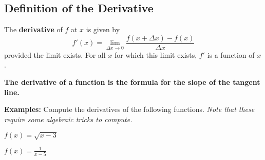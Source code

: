 \subsection*{Definition of the Derivative}
\begin{tcolorbox}[title= DEFINITION OF THE DERIVATIVE OF A FUNCTION,colframe=black,sharp corners,colback=white,colbacktitle=white,coltitle=black,boxrule=1pt]

    The \textbf{derivative} of $f$ at $x$ is given by
    \[f'(x)=\lim_{\Delta x\to0}\frac{f(x+\Delta x)-f(x)}{\Delta x}\]
    provided the limit exists. For all $x$ for which this limit exists, $f'$ is a function of $x$.
    
\end{tcolorbox}
\vspace{.15cm}
\begin{center}
    \textbf{The derivative of a function is the formula for the slope of the tangent line.}
\end{center}
\noindent\textbf{Examples:} Compute the derivatives of the following functions. \textit{Note that these require some algebraic tricks to compute.}
\begin{questions}
    \question $\displaystyle f(x)=\sqrt{x-3}$
    
    \question $\displaystyle f(x)=\frac{1}{x-5}$
\end{questions}



\newpage
